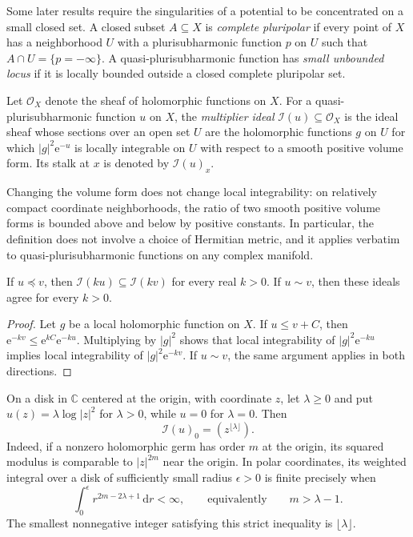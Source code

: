Some later results require the singularities of a potential to be concentrated on a small closed set. A closed subset $A\subseteq X$ is \emph{complete pluripolar} if every point of $X$ has a neighborhood $U$ with a plurisubharmonic function $p$ on $U$ such that $A\cap U=\{p=-\infty\}$. A quasi-plurisubharmonic function has \emph{small unbounded locus} if it is locally bounded outside a closed complete pluripolar set.

\begin{definition}\label{def:multiplier-ideal}
Let $\mathcal O_X$ denote the sheaf of holomorphic functions on $X$. For a quasi-plurisubharmonic function $u$ on $X$, the \emph{multiplier ideal} $\mathcal I(u)\subseteq\mathcal O_X$ is the ideal sheaf whose sections over an open set $U$ are the holomorphic functions $g$ on $U$ for which $|g|^2\mathrm{e}^{-u}$ is locally integrable on $U$ with respect to a smooth positive volume form. Its stalk at $x$ is denoted by $\mathcal I(u)_x$.
\end{definition}

Changing the volume form does not change local integrability: on relatively compact coordinate neighborhoods, the ratio of two smooth positive volume forms is bounded above and below by positive constants. In particular, the definition does not involve a choice of Hermitian metric, and it applies verbatim to quasi-plurisubharmonic functions on any complex manifold.

\begin{proposition}\label{prop:ideal-order}
If $u\preceq v$, then $\mathcal I(ku)\subseteq\mathcal I(kv)$ for every real $k>0$. If $u\sim v$, then these ideals agree for every $k>0$.
\end{proposition}
\begin{proof}
Let $g$ be a local holomorphic function on $X$. If $u\leq v+C$, then $\mathrm{e}^{-kv}\leq \mathrm{e}^{kC}\mathrm{e}^{-ku}$. Multiplying by $|g|^2$ shows that local integrability of $|g|^2\mathrm{e}^{-ku}$ implies local integrability of $|g|^2\mathrm{e}^{-kv}$. If $u\sim v$, the same argument applies in both directions.
\end{proof}

\begin{example}\label{ex:ideal-disc}
On a disk in $\mathbb C$ centered at the origin, with coordinate $z$, let $\lambda\geq0$ and put $u(z)=\lambda\log|z|^2$ for $\lambda>0$, while $u=0$ for $\lambda=0$. Then
\[
 \mathcal I(u)_0=(z^{\lfloor\lambda\rfloor}).
\]
Indeed, if a nonzero holomorphic germ has order $m$ at the origin, its squared modulus is comparable to $|z|^{2m}$ near the origin. In polar coordinates, its weighted integral over a disk of sufficiently small radius $\epsilon>0$ is finite precisely when
\[
 \int_0^\epsilon r^{2m-2\lambda+1}\,\mathrm{d}r<\infty,
 \qquad\text{equivalently}\qquad m>\lambda-1.
\]
The smallest nonnegative integer satisfying this strict inequality is $\lfloor\lambda\rfloor$.
\end{example}


